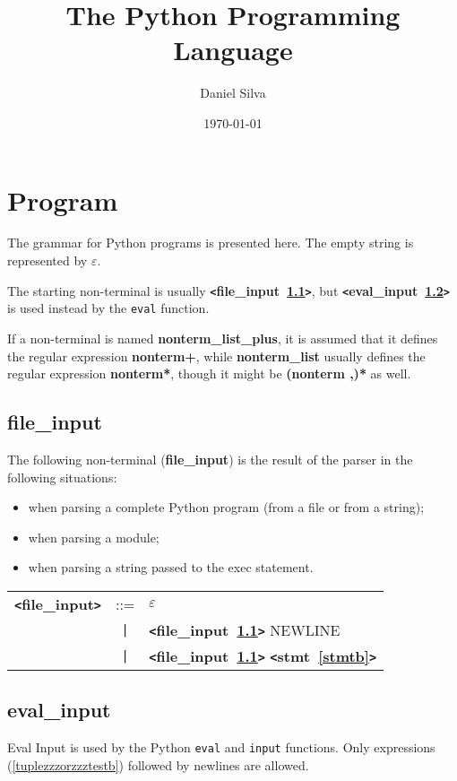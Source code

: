 \documentclass[12pt]{article}
\title{The Python Programming Language}
\author{Daniel Silva}
\date{\today}
\begin{document}
\maketitle
\tableofcontents
\newpage

\section{Program}

The grammar for Python programs is presented here.  The empty string is represented by $\varepsilon$.

The starting non-terminal is usually {\bf \verb+<+file\_input~\ref{filezzzinputb}\verb+>+}, but {\bf \verb+<+eval\_input~\ref{evalzzzinputb}\verb+>+} is used instead by the \verb|eval| function.

If a non-terminal is named {\bf nonterm\_list\_plus}, it is assumed that it defines the regular expression {\bf nonterm+}, while {\bf nonterm\_list} usually defines the regular expression {\bf nonterm*}, though it might be {\bf (nonterm ,)*} as well.

\subsection{file\_input}
\label{filezzzinputb}
The following non-terminal ({\bf file\_{}input}) is the result of the parser in the following situations:
\begin{itemize}
\item when parsing a complete Python program (from a file or from a string);
\item when parsing a module;
\item when parsing a string passed to the exec statement.
\end{itemize}

\begin{tabular}{lcl}
{\bf \verb+<+file\_input\verb+>+} & ::=  & $\varepsilon$ \\
 & \verb+|+  & {\bf \verb+<+file\_input~\ref{filezzzinputb}\verb+>+}  NEWLINE \\
 & \verb+|+  & {\bf \verb+<+file\_input~\ref{filezzzinputb}\verb+>+}  {\bf \verb+<+stmt~\ref{stmtb}\verb+>+}  \\
\end{tabular}

\subsection{eval\_input}
\label{evalzzzinputb}
Eval Input is used by the Python \verb+eval+ and \verb+input+ functions.  Only expressions (\ref{tuplezzzorzzztestb}) followed by newlines are allowed. \\
\end{document}
